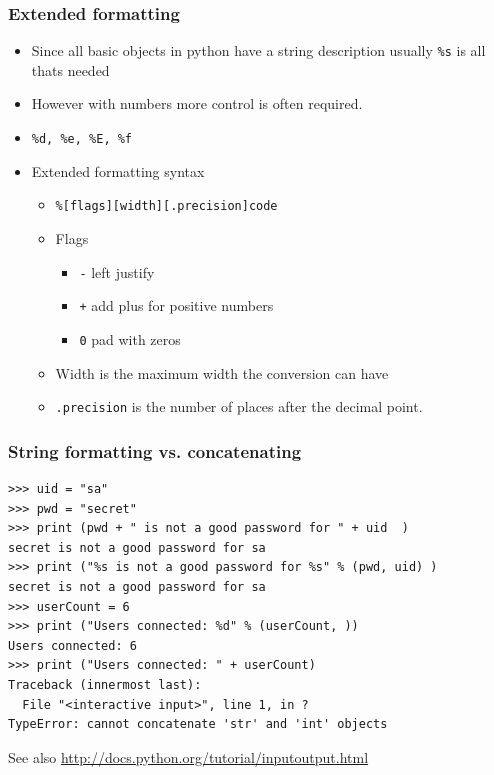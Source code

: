 \documentclass{beamer}
\begin{document}
\begin{frame}
\frametitle{Extended formatting}
\begin{itemize}
\item Since all basic objects in python have a string description usually \texttt{\%s} is all thats needed
\item However with numbers more control is often required.
\item \texttt{\%d, \%e, \%E, \%f}
\item Extended formatting syntax
\begin{itemize}
\item \texttt{\%[flags][width][.precision]code}
\item Flags
\begin{itemize}
\item \texttt{-}   left justify
\item \texttt{+}  add plus for positive numbers
\item \texttt{0}  pad with zeros
\end{itemize}
\item Width is the maximum width the conversion can have
\item \texttt{.precision} is the number of places after the decimal point.
\end{itemize}
\end{itemize}
\end{frame}

\begin{frame}[containsverbatim]
\frametitle{String formatting vs. concatenating}
\begin{lstlisting}
>>> uid = "sa"
>>> pwd = "secret"
>>> print (pwd + " is not a good password for " + uid  )    
secret is not a good password for sa
>>> print ("%s is not a good password for %s" % (pwd, uid) )
secret is not a good password for sa
>>> userCount = 6
>>> print ("Users connected: %d" % (userCount, ))            
Users connected: 6
>>> print ("Users connected: " + userCount)                 
Traceback (innermost last):
  File "<interactive input>", line 1, in ?
TypeError: cannot concatenate 'str' and 'int' objects
\end{lstlisting}
See also \url{http://docs.python.org/tutorial/inputoutput.html}
\end{frame}
\end{document}
